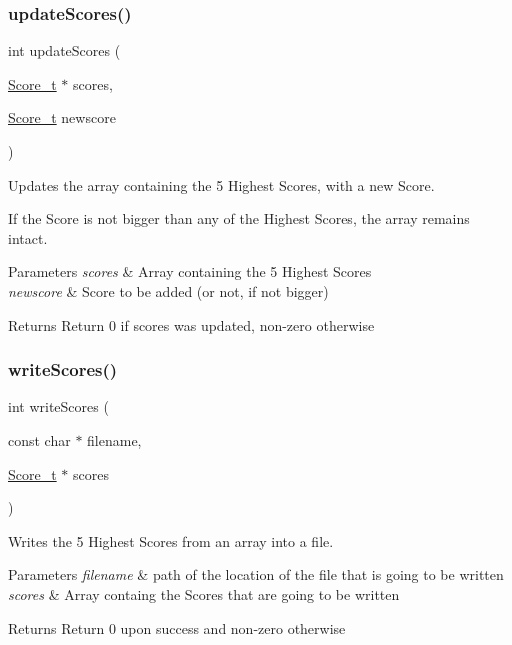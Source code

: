 \subsubsection{\texorpdfstring{update\+Scores()}{updateScores()}}
{\footnotesize\ttfamily int update\+Scores (\begin{DoxyParamCaption}\item[{\hyperlink{struct_score__t}{Score\+\_\+t} $\ast$}]{scores,  }\item[{\hyperlink{struct_score__t}{Score\+\_\+t}}]{newscore }\end{DoxyParamCaption})}



Updates the array containing the 5 Highest Scores, with a new Score. 

If the Score is not bigger than any of the Highest Scores, the array remains intact.


\begin{DoxyParams}{Parameters}
{\em scores} & Array containing the 5 Highest Scores \\
\hline
{\em newscore} & Score to be added (or not, if not bigger)\\
\hline
\end{DoxyParams}
\begin{DoxyReturn}{Returns}
Return 0 if scores was updated, non-\/zero otherwise 
\end{DoxyReturn}
\hypertarget{group___highscores_gad0af57912ba7eaec7b5ed3c892b57c10}{}\label{group___highscores_gad0af57912ba7eaec7b5ed3c892b57c10} 
\subsubsection{\texorpdfstring{write\+Scores()}{writeScores()}}
{\footnotesize\ttfamily int write\+Scores (\begin{DoxyParamCaption}\item[{const char $\ast$}]{filename,  }\item[{\hyperlink{struct_score__t}{Score\+\_\+t} $\ast$}]{scores }\end{DoxyParamCaption})}



Writes the 5 Highest Scores from an array into a file. 


\begin{DoxyParams}{Parameters}
{\em filename} & path of the location of the file that is going to be written \\
\hline
{\em scores} & Array containg the Scores that are going to be written\\
\hline
\end{DoxyParams}
\begin{DoxyReturn}{Returns}
Return 0 upon success and non-\/zero otherwise 
\end{DoxyReturn}
